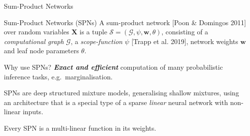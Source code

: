 \documentclass{beamer}
\newcommand{\SPN}{\mathcal{S}}
\newcommand{\graph}{\mathcal{G}}
\newcommand{\scope}{\psi}
\newcommand{\X}{\bm{X}}
\begin{document}
\begin{frame}{Sum-Product Networks}
\begin{block}{Sum-Product Networks (SPNs)}
    A sum-product network [Poon \& Domingos 2011] over random variables $\X$ is a tuple $\SPN = (\graph, \scope, \bm{w}, \theta)$, consisting of a \emph{computational graph} $\graph$, a \emph{scope-function} $\scope$ [Trapp et al. 2019], network weights $\bm{w}$ and leaf node parameters $\theta$.
\end{block}
Why use SPNs? \emph{\textbf{Exact and efficient}} computation of many probabilistic inference tasks, e.g.~marginalisation.

SPNs are deep structured mixture models, generalising shallow mixtures, using an architecture that is a special type of a sparse \emph{linear} neural network with non-linear inputs. 

Every SPN is a multi-linear function in its weights.

\end{frame}
\end{document}
